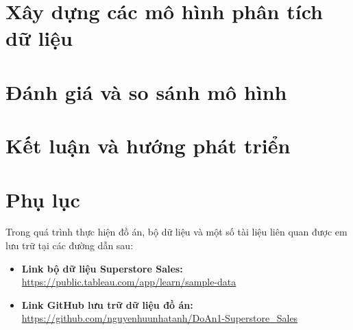 \documentclass[oneside, a4paper]{book}
\renewcommand{\thesection}{\arabic{chapter}.\arabic{section}}
\theoremstyle{plain}
\theoremstyle{plain}
\theoremstyle{remark}
\theoremstyle{definition}
\theoremstyle{remark}
\begin{document}
	\chapter{Xây dựng các mô hình phân tích dữ liệu}
	
	
	\chapter{Đánh giá và so sánh mô hình}
	
	
	\chapter{Kết luận và hướng phát triển}
	
	
	
	
	
		
	\clearpage
	\chapter*{Phụ lục}
	
	Trong quá trình thực hiện đồ án, bộ dữ liệu và một số tài liệu liên quan được em lưu trữ tại các đường dẫn sau:
	
	\begin{itemize}
		\item \textbf{Link bộ dữ liệu Superstore Sales:} \\
		\url{https://public.tableau.com/app/learn/sample-data}
		
		\item \textbf{Link GitHub lưu trữ dữ liệu đồ án:} \\
		\url{https://github.com/nguyenhuunhatanh/DoAn1-Superstore_Sales}
	\end{itemize}
	
	
	\clearpage
	
\end{document}

